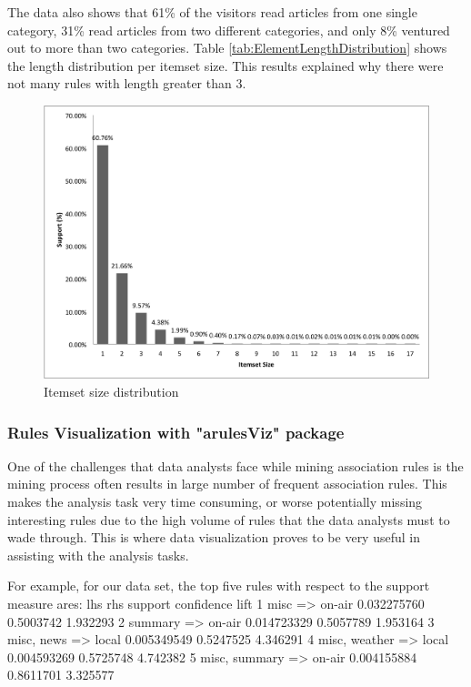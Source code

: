 \documentclass{article}
\begin{document}
The data also shows that 61\% of the visitors read articles from one single category, 31\% read articles from two different categories, and only 8\% ventured out to more than two categories.  Table \ref{tab:ElementLengthDistribution} shows the length distribution per itemset size.  This results explained why there were not many rules with length greater than 3.

\begin{figure}[h!]
  \centering
    \includegraphics[width=1.0\textwidth]{images/itemset_size_distribution}
    \caption{Itemset size distribution}
    \label{fig:itemset_size_distribution}
\end{figure}

\subsubsection{Rules Visualization with "arulesViz" package}
One of the challenges that data analysts face while mining association rules is the mining process often results in large number of frequent association rules.  This makes the analysis task very time consuming, or worse potentially missing interesting rules due to the high volume of rules that the data analysts must to wade through.  This is where data visualization proves to be very useful in assisting with the analysis tasks.  

For example, for our data set, the top five rules with respect to the support measure ares:
   lhs           rhs              support confidence     lift
1  {misc}     => {on-air}     0.032275760  0.5003742 1.932293
2  {summary}  => {on-air}     0.014723329  0.5057789 1.953164
3  {misc,                                                    
    news}     => {local}      0.005349549  0.5247525 4.346291
4  {misc,                                                    
    weather}  => {local}      0.004593269  0.5725748 4.742382
5  {misc,                                                    
    summary}  => {on-air}     0.004155884  0.8611701 3.325577
\end{document}
